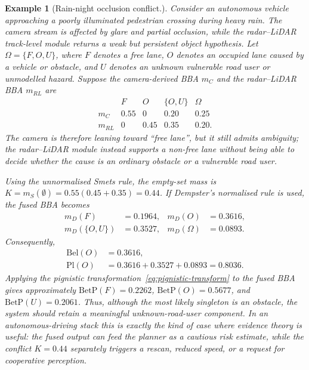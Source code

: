 \documentclass[11pt,oneside,openany]{book}
\newtheorem{example}{Example}[chapter]
\begin{document}
\begin{example}[Rain-night occlusion conflict.]
Consider an autonomous vehicle approaching a poorly illuminated pedestrian crossing during heavy rain. The camera stream is affected by glare and partial occlusion, while the radar--LiDAR track-level module returns a weak but persistent object hypothesis. Let
\(\Omega=\{F,O,U\}\), where \(F\) denotes a free lane, \(O\) denotes an occupied lane caused by a vehicle or obstacle, and \(U\) denotes an unknown vulnerable road user or unmodelled hazard. Suppose the camera-derived BBA \(m_C\) and the radar--LiDAR BBA \(m_{RL}\) are
\begin{equation}
\begin{array}{c|cccc}
 & F & O & \{O,U\} & \Omega \\
\hline
m_C & 0.55 & 0 & 0.20 & 0.25 \\
m_{RL} & 0 & 0.45 & 0.35 & 0.20 .
\end{array}
\label{eq:evidence-example-bbas}
\end{equation}
The camera is therefore leaning toward ``free lane'', but it still admits ambiguity; the radar--LiDAR module instead supports a non-free lane without being able to decide whether the cause is an ordinary obstacle or a vulnerable road user.

Using the unnormalised Smets rule, the empty-set mass is
\(K=m_S(\emptyset)=0.55(0.45+0.35)=0.44\). If Dempster's normalised rule is used, the fused BBA becomes
\begin{equation}
\begin{aligned}
m_D(F)&=0.1964, &
m_D(O)&=0.3616,\\
m_D(\{O,U\})&=0.3527, &
m_D(\Omega)&=0.0893 .
\end{aligned}
\end{equation}
Consequently,
\begin{equation}
\begin{aligned}
\mathrm{Bel}(O)&=0.3616,\\
\mathrm{Pl}(O)&=0.3616+0.3527+0.0893=0.8036 .
\end{aligned}
\end{equation}
Applying the pignistic transformation~\eqref{eq:pignistic-transform} to the fused BBA gives approximately \(\mathrm{BetP}(F)=0.2262\), \(\mathrm{BetP}(O)=0.5677\), and \(\mathrm{BetP}(U)=0.2061\). Thus, although the most likely singleton is an obstacle, the system should retain a meaningful unknown-road-user component. In an autonomous-driving stack this is exactly the kind of case where evidence theory is useful: the fused output can feed the planner as a cautious risk estimate, while the conflict \(K=0.44\) separately triggers a rescan, reduced speed, or a request for cooperative perception. 
\end{example}
\end{document}
